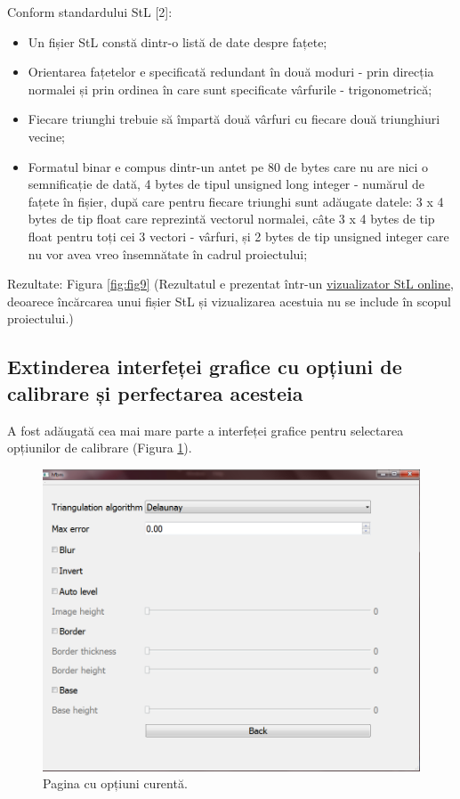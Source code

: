 \documentclass[12pt]{article}
\begin{document}
Conform standardului StL [2]:
\begin{itemize}
	\item Un fișier StL constă dintr-o listă de date despre fațete;
	\item Orientarea fațetelor e specificată redundant în două moduri - prin direcția normalei și prin ordinea în care sunt specificate vârfurile - trigonometrică;
	\item Fiecare triunghi trebuie să împartă două vârfuri cu fiecare două triunghiuri vecine;
	\item Formatul binar e compus dintr-un antet pe 80 de bytes care nu are nici o semnificație de dată, 4 bytes de tipul unsigned long integer - numărul de fațete în fișier, după care pentru fiecare triunghi sunt adăugate datele: 3 x 4 bytes de tip float care reprezintă vectorul normalei, câte 3 x 4 bytes de tip float pentru toți cei 3 vectori - vârfuri, și 2 bytes de tip unsigned integer care nu vor avea vreo însemnătate în cadrul proiectului;
\end{itemize}

Rezultate: Figura \ref{fig:fig9} (Rezultatul e prezentat într-un \href{https://www.viewstl.com/}{vizualizator StL online}, deoarece încărcarea unui fișier StL și vizualizarea acestuia nu se include în scopul proiectului.)

\subsection{Extinderea interfeței grafice cu opțiuni de calibrare și perfectarea acesteia}

A fost adăugată cea mai mare parte a interfeței grafice pentru selectarea opțiunilor de calibrare (Figura \ref{fig:fig10}). 

\begin{figure}[!htb]
	\begin{minipage}{0.96\textwidth}
		\centering
		\includegraphics[width=.7\linewidth]{DouaPaginaInterfata.png}
		\caption{Pagina cu opțiuni curentă.}\label{fig:fig10}
	\end{minipage}\hfill
\end{figure}
\end{document}
